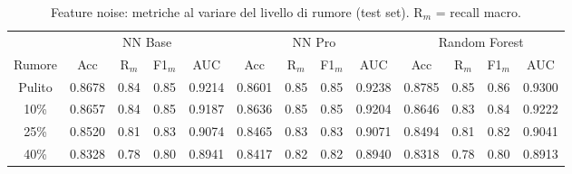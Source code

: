 \begin{table}[H]\centering\footnotesize
\setlength{\tabcolsep}{4pt}
\caption{Feature noise: metriche al variare del livello di rumore (test set). R$_m$ = recall macro.}\label{tab:fn}
\begin{tabular}{c *{12}{c}}
\toprule
 & \multicolumn{4}{c}{NN Base} & \multicolumn{4}{c}{NN Pro} & \multicolumn{4}{c}{Random Forest}\\
\cmidrule(lr){2-5}\cmidrule(lr){6-9}\cmidrule(lr){10-13}
Rumore & Acc & R$_m$ & F1$_m$ & AUC & Acc & R$_m$ & F1$_m$ & AUC & Acc & R$_m$ & F1$_m$ & AUC \\
\midrule
Pulito & 0.8678 & 0.84 & 0.85 & 0.9214 & 0.8601 & 0.85 & 0.85 & 0.9238 & 0.8785 & 0.85 & 0.86 & 0.9300 \\
10\% & 0.8657 & 0.84 & 0.85 & 0.9187 & 0.8636 & 0.85 & 0.85 & 0.9204 & 0.8646 & 0.83 & 0.84 & 0.9222 \\
25\% & 0.8520 & 0.81 & 0.83 & 0.9074 & 0.8465 & 0.83 & 0.83 & 0.9071 & 0.8494 & 0.81 & 0.82 & 0.9041 \\
40\% & 0.8328 & 0.78 & 0.80 & 0.8941 & 0.8417 & 0.82 & 0.82 & 0.8940 & 0.8318 & 0.78 & 0.80 & 0.8913 \\
\bottomrule
\end{tabular}
\end{table}
